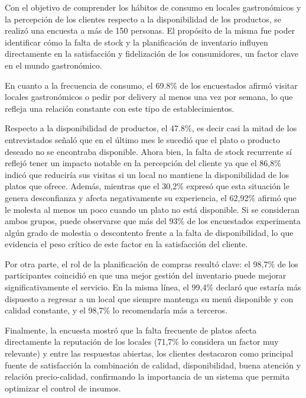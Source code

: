 
Con el objetivo de comprender los hábitos de consumo en locales gastronómicos y la percepción de los clientes respecto a la disponibilidad de los productos, se realizó una encuesta a más de 150 personas. El propósito de la misma fue poder identificar cómo la falta de stock y la planificación de inventario influyen directamente en la satisfacción y fidelización de los consumidores, un factor clave en el mundo gastronómico.

En cuanto a la frecuencia de consumo, el 69.8\% de los encuestados afirmó visitar locales gastronómicos o pedir por delivery al menos una vez por semana, lo que refleja una relación constante con este tipo de establecimientos.

Respecto a la disponibilidad de productos, el 47.8\%, es decir casi la mitad de los entrevistados señaló que en el último mes le sucedió que el plato o producto deseado no se encontraba disponible. Ahora bien, la falta de stock recurrente sí reflejó tener un impacto notable en la percepción del cliente ya que el 86,8\% indicó que reduciría sus visitas si un local no mantiene la disponibilidad de los platos que ofrece. Además, mientras que el 30,2\% expresó que esta situación le genera desconfianza y afecta negativamente su experiencia, el 62,92\% afirmó que le molesta al menos un poco cuando un plato no está disponible. Si se consideran ambos grupos, puede observarse que más del 93\% de los encuestados experimenta algún grado de molestia o descontento frente a la falta de disponibilidad, lo que evidencia el peso crítico de este factor en la satisfacción del cliente.

Por otra parte, el rol de la planificación de compras resultó clave: el 98,7\% de los participantes coincidió en que una mejor gestión del inventario puede mejorar significativamente el servicio. En la misma línea, el 99,4\% declaró que estaría más dispuesto a regresar a un local que siempre mantenga su menú disponible y con calidad constante, y el 98,7\% lo recomendaría más a terceros.

Finalmente, la encuesta mostró que la falta frecuente de platos afecta directamente la reputación de los locales (71,7\% lo considera un factor muy relevante) y entre las respuestas abiertas, los clientes destacaron como principal fuente de satisfacción la combinación de calidad, disponibilidad, buena atención y relación precio-calidad, confirmando la importancia de un sistema que permita optimizar el control de insumos.